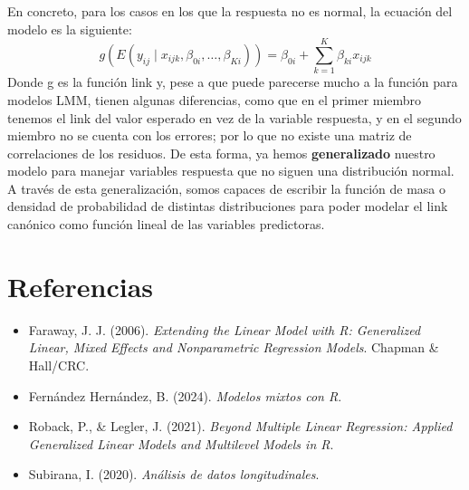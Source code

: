 \documentclass[
  letterpaper,
  DIV=11,
  numbers=noendperiod]{scrreprt}
\newlength{\cslhangindent}
\newenvironment{CSLReferences}[2] %
 {\begin{list}{}{%
  \setlength{\itemindent}{0pt}
  \setlength{\leftmargin}{0pt}
  \setlength{\parsep}{0pt}
  \ifodd #1
   \setlength{\leftmargin}{\cslhangindent}
   \setlength{\itemindent}{-1\cslhangindent}
  \fi
  \setlength{\itemsep}{#2\baselineskip}}}
 {\end{list}}
\begin{document}
En concreto, para los casos en los que la respuesta no es normal, la
ecuación del modelo es la siguiente: \[
g\left(E(y_{ij} \mid x_{ijk}, \beta_{0i}, \dots, \beta_{Ki})\right) = \beta_{0i} + \sum_{k=1}^{K} \beta_{ki}x_{ijk}
\] Donde g es la función link y, pese a que puede parecerse mucho a la
función para modelos LMM, tienen algunas diferencias, como que en el
primer miembro tenemos el link del valor esperado en vez de la variable
respuesta, y en el segundo miembro no se cuenta con los errores; por lo
que no existe una matriz de correlaciones de los residuos. De esta
forma, ya hemos \textbf{generalizado} nuestro modelo para manejar
variables respuesta que no siguen una distribución normal. A través de
esta generalización, somos capaces de escribir la función de masa o
densidad de probabilidad de distintas distribuciones para poder modelar
el link canónico como función lineal de las variables predictoras.


\chapter*{Referencias}\label{referencias}


\label{refs}
\begin{CSLReferences}{0}{1}
\begin{itemize}
\item
  Faraway, J. J. (2006). \emph{Extending the Linear Model with R:
  Generalized Linear, Mixed Effects and Nonparametric Regression
  Models}. Chapman \& Hall/CRC.
\item
  Fernández Hernández, B. (2024). \emph{Modelos mixtos con R}.
\item
  Roback, P., \& Legler, J. (2021). \emph{Beyond Multiple Linear
  Regression: Applied Generalized Linear Models and Multilevel Models in
  R}.
\item
  Subirana, I. (2020). \emph{Análisis de datos longitudinales}.
\end{itemize}

\end{CSLReferences}
\end{document}

